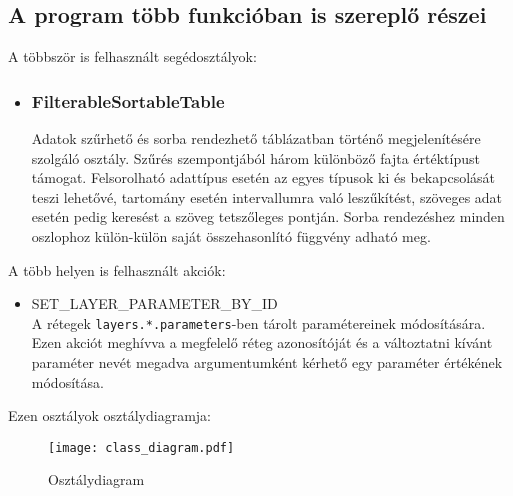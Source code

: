 \subsection{A program több funkcióban is szereplő részei}

\noindent A többször is felhasznált segédosztályok:

\begin{itemize}

\item\subsubsection{FilterableSortableTable}
Adatok szűrhető és sorba rendezhető táblázatban történő megjelenítésére szolgáló
osztály. Szűrés szempontjából három különböző fajta értéktípust támogat.
Felsorolható adattípus esetén az egyes típusok ki és bekapcsolását teszi
lehetővé, tartomány esetén intervallumra való leszűkítést, szöveges adat esetén
pedig keresést a szöveg tetszőleges pontján. Sorba rendezéshez minden oszlophoz
külön-külön saját összehasonlító függvény adható meg.

\end{itemize}

\noindent A több helyen is felhasznált akciók:
\begin{itemize}

\item SET\_LAYER\_PARAMETER\_BY\_ID \\
A rétegek \verb|layers.*.parameters|-ben tárolt paramétereinek módosítására.
Ezen akciót meghívva a megfelelő réteg azonosítóját és a változtatni kívánt
paraméter nevét megadva argumentumként kérhető egy paraméter értékének
módosítása.

\end{itemize}

Ezen osztályok osztálydiagramja:

\begin{figure}[H]
  \texttt{[image: class\_diagram.pdf]}
  \caption{Osztálydiagram}
  \label{fig:class_diagram}
\end{figure}
